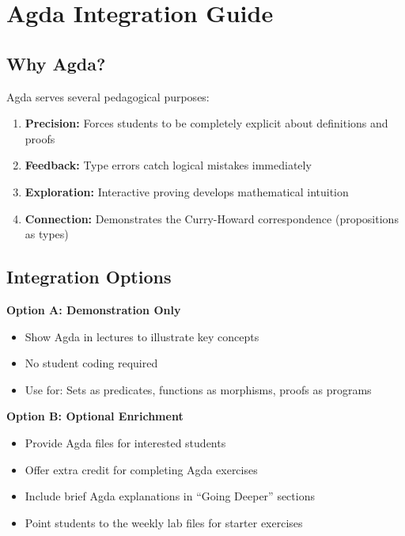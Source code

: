 \documentclass[11pt]{article}
\begin{document}
\newpage
\section{Agda Integration Guide}

\subsection{Why Agda?}
Agda serves several pedagogical purposes:
\begin{enumerate}
    \item \textbf{Precision:} Forces students to be completely explicit about definitions and proofs
    \item \textbf{Feedback:} Type errors catch logical mistakes immediately
    \item \textbf{Exploration:} Interactive proving develops mathematical intuition
    \item \textbf{Connection:} Demonstrates the Curry-Howard correspondence (propositions as types)
\end{enumerate}

\subsection{Integration Options}

\textbf{Option A: Demonstration Only}
\begin{itemize}
    \item Show Agda in lectures to illustrate key concepts
    \item No student coding required
    \item Use for: Sets as predicates, functions as morphisms, proofs as programs
\end{itemize}

\textbf{Option B: Optional Enrichment}
\begin{itemize}
    \item Provide Agda files for interested students
    \item Offer extra credit for completing Agda exercises
    \item Include brief Agda explanations in ``Going Deeper'' sections
    \item Point students to the weekly lab files for starter exercises
\end{itemize}
\end{document}
